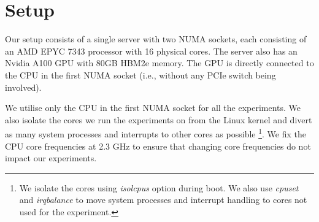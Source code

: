 \section{Setup}
\label{sec:interconnect-sc-setup}

Our setup consists of a single server with two NUMA sockets, each consisting of an AMD EPYC 7343 processor with 16 physical cores.
The server also has an Nvidia A100 GPU with 80GB HBM2e memory.
The GPU is directly connected to the CPU in the first NUMA socket (i.e., without any PCIe switch being involved).

We utilise only the CPU in the first NUMA socket for all the experiments.
We also isolate the cores we run the experiments on from the Linux kernel and divert as many system processes and interrupts to other cores as possible
\footnote{We isolate the cores using \textit{isolcpus} option during boot. We also use \textit{cpuset} and \textit{irqbalance} to move system processes and interrupt handling to cores not used for the experiment.}.
We fix the CPU core frequencies at 2.3 GHz to ensure that changing core frequencies do not impact our experiments.
